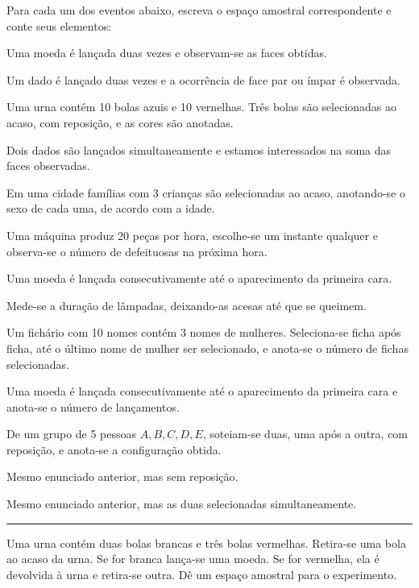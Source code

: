 \documentclass[a4paper,11pt,fleqn]{article}\usepackage[]{graphicx}\usepackage[]{color}
\theoremstyle{definition}
\begin{document}
\begin{compactenum} %
\item Para cada um dos eventos abaixo, escreva o espaço amostral
  correspondente e conte seus elementos:
  \begin{compactenum}
  \item Uma moeda é lançada duas vezes e observam-se as faces obtidas.
  \item Um dado é lançado duas vezes e a ocorrência de face par ou ímpar
    é observada.
  \item Uma urna contém 10 bolas azuis e 10 vernelhas. Três bolas são
    selecionadas ao acaso, com reposição, e as cores são anotadas.
  \item Dois dados são lançados simultaneamente e estamos interessados
    na soma das faces observadas.
  \item Em uma cidade famílias com 3 crianças são selecionadas ao acaso,
    anotando-se o sexo de cada uma, de acordo com a idade.
  \item Uma máquina produz 20 peças por hora, escolhe-se um instante
    qualquer e observa-se o número de defeituosas na próxima hora.
  \item Uma moeda é lançada consecutivamente até o aparecimento da
    primeira cara.
  \item Mede-se a duração de lâmpadas, deixando-as acesas até que se
    queimem.
  \item Um fichário com 10 nomes contém 3 nomes de mulheres.
    Seleciona-se ficha após ficha, até o último nome de mulher ser
    selecionado, e anota-se o número de fichas selecionadas.
  \item Uma moeda é lançada consecutivamente até o aparecimento da
    primeira cara e anota-se o número de lançamentos.
  \item De um grupo de 5 pessoas ${A, B, C, D, E}$, soteiam-se duas, uma
    após a outra, com reposição, e anota-se a configuração obtida.
  \item Mesmo enunciado anterior, mas sem reposição.
  \item Mesmo enunciado anterior, mas as duas selecionadas
    simultaneamente.
  \end{compactenum}

\vspace{0.3cm}
\hrule
\vspace{0.3cm}

\item Uma urna contém duas bolas brancas e três bolas vermelhas.
  Retira-se uma bola ao acaso da urna. Se for branca lança-se uma moeda.
  Se for vermelha, ela é devolvida à urna e retira-se outra. Dê um
  espaço amostral para o experimento.


\end{compactenum}
\end{document}
